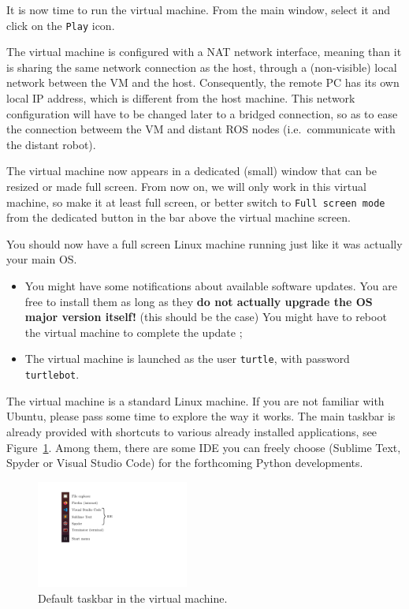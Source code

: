 \documentclass[10pt,a4paper,printanswers]{upmc}
\begin{document}
It is now time to run the virtual machine. From the main window, select it and click on the
\texttt{Play} icon.
%
\begin{mdframed}[style=graybox]
  The virtual machine is configured with a NAT network interface, meaning than it is sharing the
  same network connection as the host, through a (non-visible) local network between the VM and the
  host. Consequently, the remote PC has its own local IP address, which is different from the host
  machine. This network configuration will have to be changed later to a bridged connection, so as
  to ease the connection betweem the VM and distant ROS nodes (i.e.\ communicate with the distant
  robot).
\end{mdframed}
The virtual machine now appears in a dedicated (small) window that can be resized or made full
screen. From now on, we will only work in this virtual machine, so make it at least full screen, or
better switch to \texttt{Full screen mode} from the dedicated button in the bar above the virtual
machine screen.

You should now have a full screen Linux machine running just like it was actually your main OS.
%
\begin{mdframed}[style=graybox]
  \begin{itemize}
    \item You might have some notifications about available software updates. You are free to
          install them as long as they \textbf{do not actually upgrade the OS major version itself!}
          (this should be the case) You might have to reboot the virtual machine to complete the
          update ;
    \item The virtual machine is launched as the user \texttt{turtle}, with password
          \texttt{turtlebot}.
  \end{itemize}
\end{mdframed}

The virtual machine is a standard Linux machine. If you are not familiar with Ubuntu, please pass
some time to explore the way it works. The main taskbar is already provided with shortcuts to
various already installed applications, see Figure~\ref{fig:taskbar}. Among them, there are some IDE
you can freely choose (Sublime Text, Spyder or Visual Studio Code) for the forthcoming Python
developments.
%
\begin{figure}[!h]
  \centering \includegraphics[width=5cm]{figures/taskbar.pdf}
  \caption{Default taskbar in the virtual machine.}
  \label{fig:taskbar}
\end{figure}
\end{document}
